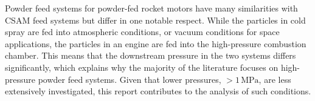 Powder feed systems for powder-fed rocket motors have many similarities with CSAM feed systems but differ in one notable respect. While the particles in cold spray are fed into atmospheric conditions, or vacuum conditions for space applications, the particles in an engine are fed into the high-pressure combustion chamber. This means that the downstream pressure in the two systems differs significantly, which explains why the majority of the literature focuses on high-pressure powder feed systems. Given that lower pressures, $>1\,\mathrm{MPa}$, are less extensively investigated, this report contributes to the analysis of such conditions.

